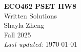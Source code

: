 \documentclass{article} %
\begin{document}
\clearpage 
\thispagestyle{empty} 

\vspace*{2em}
\begin{center}
    {\Large\bfseries ECO462 PSET HW8} \\
    \vspace{0.5em}
    {\Large Written Solutions} \\[2em] 
    {\large Shayla Zheng} \\[1em]
    {Fall 2025} \\ [1em]
    {\textit{Last updated}: \today}
\end{center}


\end{document}

